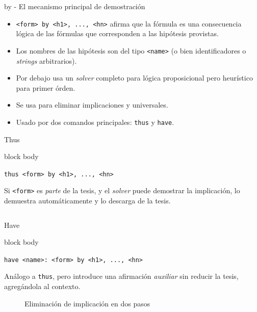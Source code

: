 \documentclass[xcolor={dvipsnames},spanish]{beamer}
\newenvironment{command}
    {
        \begin{beamercolorbox}[sep=8pt,center,shadow=true,rounded=true]{block body}
    }
    {\end{beamercolorbox}}
\begin{document}
\begin{frame}{by - El mecanismo principal de demostración}
    \begin{itemize}
        \item \lstinline{<form> by <h1>, ..., <hn>} afirma que la fórmula es una consecuencia lógica de las fórmulas que corresponden a las hipótesis provistas.
        \item Los nombres de las hipótesis son del tipo \lstinline{<name>} (o bien identificadores o \textit{strings} arbitrarios).
        \item Por debajo usa un \textit{solver} completo para lógica proposicional pero heurístico para primer órden.
        \item Se usa para eliminar implicaciones y universales.
        \item Usado por dos comandos principales: \lstinline{thus} y \lstinline{have}.
    \end{itemize}
\end{frame}


\begin{frame}[fragile]{Thus}
    \begin{command}
    \lstinline{thus <form> by <h1>, ..., <hn>}
    \end{command}

    Si \lstinline{<form>} es \textit{parte} de la tesis, y el \textit{solver} puede demostrar la implicación, lo demuestra automáticamente y lo descarga de la tesis.
    \begin{columns}
        \begin{column}{0.5\textwidth}
            
        \end{column}
        \begin{column}{0.5\textwidth}
            
        \end{column}
    \end{columns}
\end{frame}

\begin{frame}[fragile]{Have}
    \begin{command}
    \lstinline{have <name>: <form> by <h1>, ..., <hn>}
    \end{command}

    Análogo a \lstinline{thus}, pero introduce una afirmación \textit{auxiliar}
    sin reducir la tesis, agregándola al contexto.
    
    \begin{figure}[H]
        \centering
        \small Eliminación de implicación en dos pasos
        
        \begin{tabular}{c}
            
        \end{tabular}
    \end{figure}

\end{frame}
\end{document}
